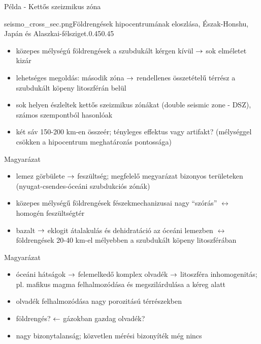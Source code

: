 \documentclass{beamer}
\begin{document}
\begin{frame}{Példa - Kettős szeizmikus zóna}
    \begin{figp}{seismo_cross_sec.png}{Földrengések hipocentrumának eloszlása, Észak-Honshu, Japán és Alaszkai-félsziget.}{0.45}{0.45}
        \begin{itemize}
            \item közepes mélységú földrengések a szubdukált kérgen kívül $\rightarrow$ sok elméletet kizár
            \item lehetséges megoldás: második zóna $\rightarrow$ rendellenes összetételű térrész a szubdukált köpeny litoszférán belül
            \item sok helyen észleltek kettős szeizmikus zónákat (double seismic zone - DSZ), számos szempontból hasonlóak
            \item két sáv 150-200 km-en összeér; tényleges effektus vagy artifakt? (mélységgel csökken a hipocentrum meghatározás pontossága)
        \end{itemize}
    \end{figp}
\end{frame}


\begin{frame}{Magyarázat}
    \begin{itemize}
        \item lemez görbülete $\rightarrow$ feszültség; megfelelő megyarázat bizonyos területeken (nyugat-csendes-óceáni szubdukciós zónák)
        \item közepes mélységű földrengések fészekmechanizusai nagy ``szórás'' $\leftrightarrow$ homogén feszültségtér
        \item bazalt $\rightarrow$ eklogit átalakulás és dehidratáció az óceáni lemezben $\leftrightarrow$ földrengések 20-40 km-el mélyebben a szubdukált köpeny litoszférában
    \end{itemize}
\end{frame}

\begin{frame}{Magyarázat}
    \begin{center}
    \begin{minipage}[c]{0.9\textwidth}
    \end{minipage}
    \vspace{10pt}
    
    \begin{itemize}
        \item óceáni hátságok $\rightarrow$ felemelkedő komplex olvadék $\rightarrow$ litoszféra inhomogenitás; pl. mafikus magma felhalmozódása és megszilárdulása a kéreg alatt
        \item olvadék felhalmozódása nagy porozitású térrészekben
        \item földrengés? $\leftarrow$ gázokban gazdag olvadék?
        \item nagy bizonytalanság; közvetlen mérési bizonyíték még nincs
    \end{itemize}
    \end{center}
\end{frame}
\end{document}
